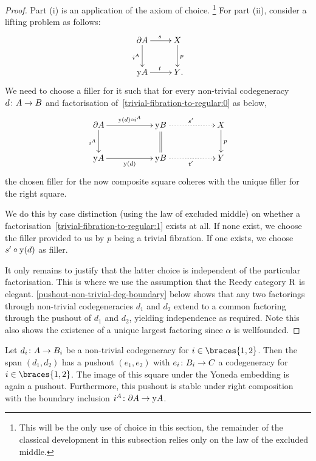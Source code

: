 \documentclass[reqno,10pt,a4paper,oneside,draft]{amsart}
\begin{document}
\begin{proof}
Part (i) is an application of the axiom of choice.%
\footnote{This will be the only use of choice in this section, the remainder of the classical development in this subsection relies only on the law of the excluded middle.}
For part (ii), consider a lifting problem as follows:
\begin{equation} \label{trivial-fibration-to-regular:0}
\xymatrix{
  \partial A
  \ar[d]_{i^A}
  \ar[r]^{s}
&
  X
  \ar[d]^{p}
\\
  \yon A
  \ar[r]^{t}
&
  Y \rlap{.}
}
\end{equation}
We need to choose a filler for it such that for every non-trivial codegeneracy $d \colon A \to B$ and factorisation of~\eqref{trivial-fibration-to-regular:0} as below,
\begin{equation} \label{trivial-fibration-to-regular:1}
\xymatrix@C+3em{
  \partial A
  \ar[r]^{\yon(d) \cc i^A}
  \ar[d]_{i^A}
&
  \yon B
  \ar@{.>}[r]^{s'}
  \ar@{=}[d]
&
  X
  \ar[d]^{p}
\\
  \yon A
  \ar[r]_{\yon(d)}
&
  \yon B
  \ar@{.>}[r]_{t'}
&
  Y
}
\end{equation}
the chosen filler for the now composite square coheres with the unique filler for the right square.

We do this by case distinction (using the law of excluded middle) on whether a factorisation~\eqref{trivial-fibration-to-regular:1} exists at all.
If none exist, we choose the filler provided to us by $p$ being a trivial fibration.
If one exists, we choose $s' \mathbin{\circ} \mathrm{y}(d)$ as filler.

It only remains to justify that the latter choice is independent of the particular factorisation.
This is where we use the assumption that the Reedy category $\mathrm{R}$ is elegant.
\cref{pushout-non-trivial-deg-boundary} below shows that any two factorings through non-trivial codegeneracies $d_1$ and $d_2$ extend to a common factoring through the pushout of $d_1$ and $d_2$, yielding independence as required.
Note this also shows the existence of a unique largest factoring since $\alpha$ is wellfounded.
\end{proof}

\begin{lemma}
\label{pushout-non-trivial-deg-boundary}
Let $d_i \colon A \to B_i$ be a non-trivial codegeneracy for $i \in \braces{1, 2}$.
Then the span $(d_1, d_2)$ has a pushout $(e_1, e_2)$ with $e_i \colon B_i \to C$ a codegeneracy for $i \in \braces{1, 2}$.
The image of this square under the Yoneda embedding is again a pushout.
Furthermore, this pushout is stable under right composition with the boundary inclusion $i^A \colon \partial A \to \mathrm{y} A$.
\end{lemma}
\end{document}
